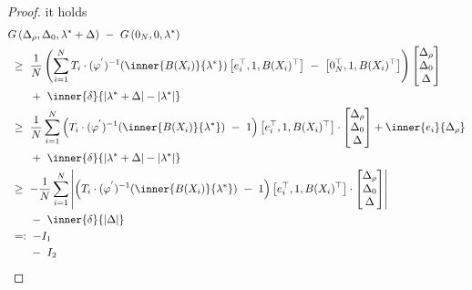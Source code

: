 \begin{proof}
it holds
\begin{align*}
\label{99909}
\begin{split}
  &
  G
   \left( 
\Delta_\rho,\Delta_0,\lambda^*+\Delta
   \right)
   \ 
   -
   \ 
   G
   \left(
0_N,0,\lambda^*
   \right)
   \\
   &
   \ 
   \ge
   \ 
   \frac{1}{N}
  \left( 
\sum_{i=1} 
  ^N
  T_i
  \cdot
  (
  \varphi^{'}
  )
  ^{-1}
  \!
  \left( 
\inner
{B(X_i)}
{
\lambda^*
}
  \right)
  \left[ 
    e_i^\top,1,B(X_i)^\top
  \right]
  \ 
  -
  \ 
  \left[ 
    0_N^\top,1,B(X_i)^\top
  \right]
  \right)
  \begin{bmatrix}
    \Delta_\rho\\\Delta_0\\\Delta
  \end{bmatrix}
    \\
  &
  \qquad
  +
  \ 
  \inner{\delta}
  {|
\lambda^*
+
\Delta
  |
  -
  |
\lambda^*
  |
}
\\
   &
   \ 
   \ge
   \ 
   \frac{1}{N}
\sum_{i=1} 
  ^N
  \left( 
    T_i\cdot
  (
  \varphi^{'}
  )
  ^{-1}
  \!
  \left( 
\inner
{B(X_i)}
{
\lambda^*
}
  \right)
  \ 
  -
  \ 
  1
  \right)
  \left[ 
    e_i^\top,1,B(X_i)^\top
  \right]
  \cdot
  \begin{bmatrix}
    \Delta_\rho\\\Delta_0\\\Delta
  \end{bmatrix}
  +
  \inner{e_i}{\Delta_\rho}
  \\
  &
  \qquad
  +
  \ 
  \inner{\delta}
  {|
\lambda^*
+
\Delta
  |
  -
  |
\lambda^*
  |
}
\\
   &
   \ 
   \ge
   \ 
   -
   \frac{1}{N}
\sum_{i=1} 
  ^N
  \left|
   \left( 
     T_i\cdot
  (
  \varphi^{'}
  )
  ^{-1}
  \!
  \left( 
\inner
{B(X_i)}
{
\lambda^*
}
  \right)
  \ 
  -
  \ 
  1
  \right)
  \left[ 
    e_i^\top,1,B(X_i)^\top
  \right]
  \cdot
  \begin{bmatrix}
    \Delta_\rho\\\Delta_0\\\Delta
  \end{bmatrix}
  \right|
  \\
  &
  \qquad
  -
  \ 
  \inner{\delta}
  {|
\Delta
  |
}
\\
&
\
=:
\ 
-
I_1
\\
&
\qquad
-
\
 I_2
\end{split}
\end{align*}

\end{proof}
